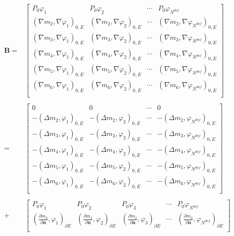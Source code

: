 \begin{equation*}
\begin{aligned}
\mathbf B =& 
\begin{bmatrix}
P_0\varphi_1 & P_0\varphi_2 & \cdots & P_0\varphi_{N^{dof}}\\
(\nabla m_2, \nabla\varphi_1)_{0, E} & (\nabla m_2, \nabla\varphi_2)_{0, E} & \cdots & (\nabla m_2, \nabla\varphi_{N^{dof}})_{0, E}\\
(\nabla m_{3}, \nabla\varphi_1)_{0, E} & (\nabla m_3, \nabla\varphi_2)_{0, E} & \cdots & (\nabla m_{3}, \nabla\varphi_{N^{dof}})_{0, E}\\
(\nabla m_{4}, \nabla\varphi_1)_{0, E} & (\nabla m_4, \nabla\varphi_2)_{0, E} & \cdots & (\nabla m_{4}, \nabla\varphi_{N^{dof}})_{0, E}\\
(\nabla m_{5}, \nabla\varphi_1)_{0, E} & (\nabla m_5, \nabla\varphi_2)_{0, E} & \cdots & (\nabla m_{5}, \nabla\varphi_{N^{dof}})_{0, E}\\
(\nabla m_{6}, \nabla\varphi_1)_{0, E} & (\nabla m_6, \nabla\varphi_2)_{0, E} & \cdots & (\nabla m_{6}, \nabla\varphi_{N^{dof}})_{0, E}\\
\end{bmatrix}\\
\\
= & \begin{bmatrix}
0 & 0 & \cdots & 0\\
-(\Delta m_2,\varphi_1)_{0, E} & -(\Delta m_2,\varphi_2)_{0, E} & \cdots & -(\Delta m_2,\varphi_{N^{dof}})_{0, E}\\
-(\Delta m_{3}, \varphi_1)_{0, E} & -(\Delta m_{3}, \varphi_2)_{0, E} & \cdots & -(\Delta m_{3},\varphi_{N^{dof}})_{0, E}\\
-(\Delta m_{4}, \varphi_1)_{0, E} & -(\Delta m_{4}, \varphi_2)_{0, E} & \cdots & -(\Delta m_{4},\varphi_{N^{dof}})_{0, E}\\
-(\Delta m_{5}, \varphi_1)_{0, E} & -(\Delta m_{5}, \varphi_2)_{0, E} & \cdots & -(\Delta m_{5},\varphi_{N^{dof}})_{0, E}\\
-(\Delta m_{6}, \varphi_1)_{0, E} & -(\Delta m_{6}, \varphi_2)_{0, E} & \cdots & -(\Delta m_{6},\varphi_{N^{dof}})_{0, E}\\
\end{bmatrix}\\
\\
+ & \begin{bmatrix}
P_0\varphi_1 & P_0\varphi_2 & P_0\varphi_3 & \cdots & P_0\varphi_{N^{dof}}\\
(\frac{ \partial m_2}{\partial \mathbf n},\varphi_1)_{\partial E} & (\frac{ \partial m_2}{\partial \mathbf n},\varphi_2)_{\partial E} & (\frac{ \partial m_2}{\partial \mathbf n},\varphi_3)_{\partial E} & \cdots & (\frac{\partial m_2}{\partial \mathbf n},\varphi_{N^{dof}})_{\partial E}\\

\end{bmatrix}
\end{aligned}
\end{equation*}
